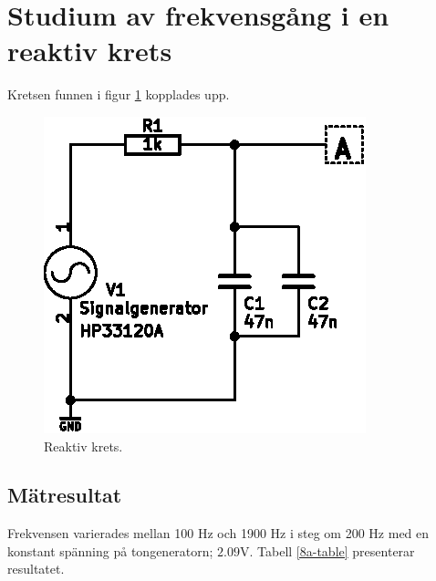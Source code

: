 \documentclass[11pt,a4paper]{article}
\begin{document}
\section{Studium av frekvensgång i en reaktiv krets}\label{}
Kretsen funnen i figur \ref{fig:8-schem} kopplades upp.
\begin{figure}[htbp]
    \centering
        \includegraphics[scale=1.0]{img/8-schem.eps}
    \caption{Reaktiv krets.}
    \label{fig:8-schem}
\end{figure}


\subsection{Mätresultat}\label{}
Frekvensen varierades mellan 100 \si{\hertz} och 1900 \si{\hertz} i steg om 200
\si{\hertz} med en konstant spänning på tongeneratorn; $2.09\si{\volt}$.
Tabell \ref{8a-table} presenterar resultatet.
\end{document}
